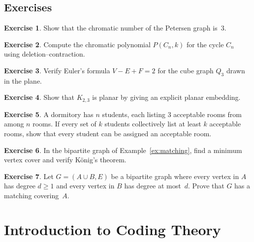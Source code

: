 \documentclass[12pt,a4paper,openany]{book}
\theoremstyle{definition}
\newtheorem{exercise}{Exercise}[chapter]
\theoremstyle{plain}
\theoremstyle{remark}
\begin{document}
\section{Exercises}
\label{sec:ex-ch10}

\begin{exercise}
\label{exo:chi-petersen}
Show that the chromatic number of the Petersen graph is~$3$.
\end{exercise}

\begin{exercise}
\label{exo:chromatic-cycle}
Compute the chromatic polynomial $P(C_n,k)$ for the cycle $C_n$ using
deletion--contraction.
\end{exercise}

\begin{exercise}
\label{exo:euler-formula-verify}
Verify Euler's formula $V-E+F=2$ for the cube graph $Q_3$ drawn in the
plane.
\end{exercise}

\begin{exercise}
\label{exo:K23-planar}
Show that $K_{2,3}$ is planar by giving an explicit planar embedding.
\end{exercise}

\begin{exercise}
\label{exo:hall-application}
A dormitory has $n$ students, each listing $3$ acceptable rooms from
among $n$ rooms.  If every set of $k$ students collectively list at
least $k$ acceptable rooms, show that every student can be assigned an
acceptable room.
\end{exercise}

\begin{exercise}
\label{exo:konig-verify}
In the bipartite graph of Example~\ref{ex:matching}, find a minimum
vertex cover and verify K\"onig's theorem.
\end{exercise}

\begin{exercise}
\label{exo:bipartite-degree}
Let $G=(A\cup B,E)$ be a bipartite graph where every vertex in $A$ has
degree $d\ge 1$ and every vertex in $B$ has degree at most~$d$.  Prove
that $G$ has a matching covering~$A$.
\end{exercise}


\chapter{Introduction to Coding Theory}
\label{ch:coding-theory}
\end{document}
